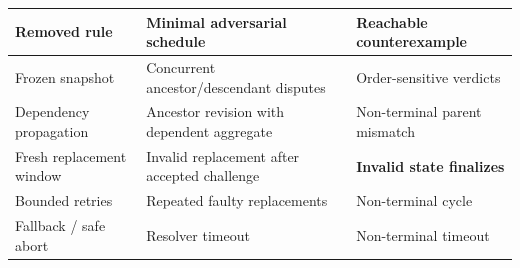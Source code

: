 \begin{tabularx}{\textwidth}{@{}p{2.7cm}p{4.1cm}X@{}}
\toprule
Removed rule & Minimal adversarial schedule & Reachable counterexample \\
\midrule
Frozen snapshot & Concurrent ancestor/descendant disputes & Order-sensitive verdicts \\
Dependency propagation & Ancestor revision with dependent aggregate & Non-terminal parent mismatch \\
Fresh replacement window & Invalid replacement after accepted challenge & \textbf{Invalid state finalizes} \\
Bounded retries & Repeated faulty replacements & Non-terminal cycle \\
Fallback / safe abort & Resolver timeout & Non-terminal timeout \\
\bottomrule
\end{tabularx}
